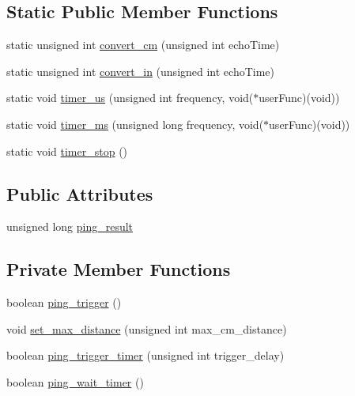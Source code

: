 \subsection*{Static Public Member Functions}
\begin{DoxyCompactItemize}
\item 
static unsigned int \mbox{\hyperlink{class_new_ping_a48beafc2846a2e5b069c25572f4ba360}{convert\+\_\+cm}} (unsigned int echo\+Time)
\item 
static unsigned int \mbox{\hyperlink{class_new_ping_ab6a1cb162229f34d1cb89b4827f26077}{convert\+\_\+in}} (unsigned int echo\+Time)
\item 
static void \mbox{\hyperlink{class_new_ping_a14c3a18861179c75dc04a819728d8140}{timer\+\_\+us}} (unsigned int frequency, void($\ast$user\+Func)(void))
\item 
static void \mbox{\hyperlink{class_new_ping_a2552285b019633be9069d030d5417e73}{timer\+\_\+ms}} (unsigned long frequency, void($\ast$user\+Func)(void))
\item 
static void \mbox{\hyperlink{class_new_ping_a58e3e7f80918b56235b5c783d2ecea50}{timer\+\_\+stop}} ()
\end{DoxyCompactItemize}
\subsection*{Public Attributes}
\begin{DoxyCompactItemize}
\item 
unsigned long \mbox{\hyperlink{class_new_ping_a5d78ebdbffa4f42124ff7e06860503e6}{ping\+\_\+result}}
\end{DoxyCompactItemize}
\subsection*{Private Member Functions}
\begin{DoxyCompactItemize}
\item 
boolean \mbox{\hyperlink{class_new_ping_a60172cfe9c5e9f035424da1883868b01}{ping\+\_\+trigger}} ()
\item 
void \mbox{\hyperlink{class_new_ping_a97700af99b7a34b067431d0607c4740e}{set\+\_\+max\+\_\+distance}} (unsigned int max\+\_\+cm\+\_\+distance)
\item 
boolean \mbox{\hyperlink{class_new_ping_a15a189b65c8de58e4513e942e0cc30d6}{ping\+\_\+trigger\+\_\+timer}} (unsigned int trigger\+\_\+delay)
\item 
boolean \mbox{\hyperlink{class_new_ping_a00188135a88d3eb4da3a8c9e3d95becd}{ping\+\_\+wait\+\_\+timer}} ()
\end{DoxyCompactItemize}

